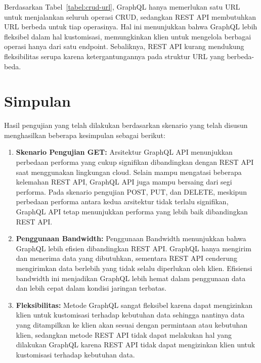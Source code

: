 \documentclass[
 manuscript=article,  %
  layout=publish, 
  year=2024, 
  month= Februari, %
  volume=8,
  number=1 
]{JIKO}
\begin{document}
Berdasarkan Tabel~\ref{tabel:crud-url}, GraphQL hanya memerlukan satu URL untuk menjalankan seluruh operasi CRUD, sedangkan REST API membutuhkan URL berbeda untuk tiap operasinya. Hal ini menunjukkan bahwa GraphQL lebih fleksibel dalam hal kustomisasi, memungkinkan klien untuk mengelola berbagai operasi hanya dari satu endpoint. Sebaliknya, REST API kurang mendukung fleksibilitas serupa karena ketergantungannya pada struktur URL yang berbeda-beda.






\section{Simpulan}

Hasil pengujian yang telah dilakukan berdasarkan skenario yang telah disusun menghasilkan beberapa kesimpulan sebagai berikut:

\begin{enumerate}[left=0.5in]
    \item \textbf{Skenario Pengujian GET:} Arsitektur GraphQL API menunjukkan perbedaan performa yang cukup signifikan dibandingkan dengan REST API saat menggunakan lingkungan cloud. Selain mampu mengatasi beberapa kelemahan REST API, GraphQL API juga mampu bersaing dari segi performa. Pada skenario pengujian POST, PUT, dan DELETE, meskipun perbedaan performa antara kedua arsitektur tidak terlalu signifikan, GraphQL API tetap menunjukkan performa yang lebih baik dibandingkan REST API.
    \item \textbf{Penggunaan Bandwidth:} Penggunaan Bandwidth menunjukkan bahwa GraphQL lebih efisien dibandingkan REST API. GraphQL hanya mengirim dan menerima data yang dibutuhkan, sementara REST API cenderung mengirimkan data berlebih yang tidak selalu diperlukan oleh klien. Efisiensi bandwidth ini menjadikan GraphQL lebih hemat dalam penggunaan data dan lebih cepat dalam kondisi jaringan terbatas.
    \item \textbf{Fleksibilitas:} Metode GraphQL sangat fleksibel karena dapat mengizinkan klien untuk kustomisasi terhadap kebutuhan data sehingga nantinya data yang ditampilkan ke klien akan sesuai dengan permintaan atau kebutuhan klien, sedangkan metode REST API tidak dapat melakukan hal yang dilakukan GraphQL karena REST API tidak dapat mengizinkan klien untuk kustomisasi terhadap kebutuhan data.
\end{enumerate}
\end{document}
